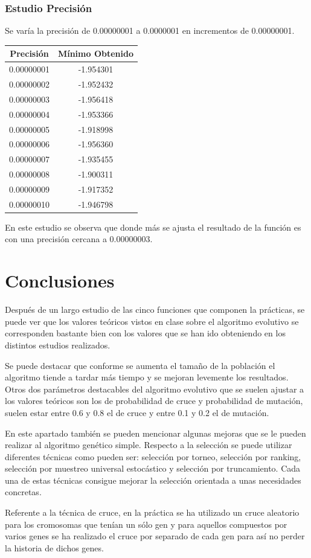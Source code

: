 \documentclass[12pt]{article}
\begin{document}
\subsubsection*{Estudio Precisión}
	Se varía la precisión de 0.00000001 a 0.0000001 en incrementos de 0.00000001.
\begin{table}[H]
\begin{center}
\begin{tabular}{|cc|} \hline
Precisión & Mínimo Obtenido \\  \hline
0.00000001 & -1.954301 \\ 
0.00000002 & -1.952432 \\ 
0.00000003 & -1.956418 \\
0.00000004 & -1.953366 \\
0.00000005 & -1.918998 \\
0.00000006 & -1.956360 \\
0.00000007 & -1.935455 \\
0.00000008 & -1.900311 \\ 
0.00000009 & -1.917352 \\
0.00000010 & -1.946798 \\  \hline
\end{tabular}
\end{center}
\end{table}
	En este estudio se observa que donde más se ajusta el resultado de la función es con una precisión cercana a 0.00000003. 

\section{Conclusiones}
	Después de un largo estudio de las cinco funciones que componen la prácticas, se puede ver que los valores teóricos
    vistos en clase sobre el algoritmo evolutivo se corresponden bastante bien con los valores que se han ido obteniendo
    en los distintos estudios realizados.

    Se puede destacar que conforme se aumenta el tamaño de la población el algoritmo
    tiende a tardar más tiempo y se mejoran levemente los resultados. Otros dos parámetros destacables del algoritmo evolutivo
    que se suelen ajustar a los valores teóricos son los de probabilidad de cruce y probabilidad de mutación, suelen estar
    entre 0.6 y 0.8 el de cruce y entre 0.1 y 0.2 el de mutación.

	En este apartado también se pueden mencionar algunas mejoras que se le pueden realizar al algoritmo genético simple. Respecto a la selección se puede utilizar diferentes técnicas como pueden ser: selección por torneo, selección por ranking, selección por muestreo universal estocástico y selección por truncamiento. Cada una de estas técnicas consigue mejorar la selección orientada a unas necesidades concretas.

	Referente a la técnica de cruce, en la práctica se ha utilizado un cruce aleatorio para los cromosomas que tenían un sólo gen y para aquellos compuestos por varios genes se ha realizado el cruce por separado de cada gen para así no perder la historia de dichos genes.  
\end{document}
